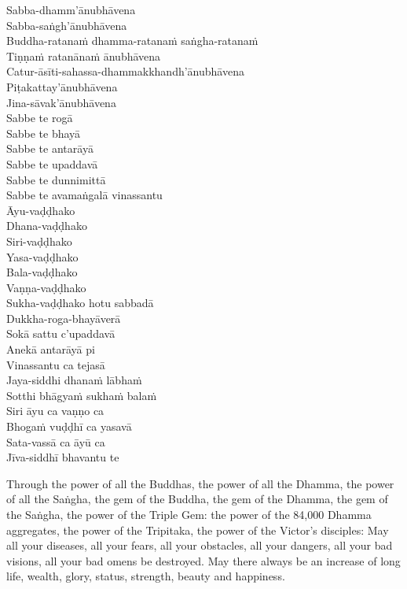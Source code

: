 \vspace{-0.99em}

\begin{pali-hang}
  Sabba-dhamm'ānubhāvena\\
  Sabba-saṅgh'ānubhāvena\\
  Buddha-ratanaṁ dhamma-ratanaṁ saṅgha-ratanaṁ\\
  Tiṇṇaṁ ratanānaṁ ānubhāvena\\
  Catur-āsīti-sahassa-dhammakkhandh'ānubhāvena\\
  Piṭakattay'ānubhāvena\\
  Jina-sāvak'ānubhāvena\\
  Sabbe te rogā\\
  Sabbe te bhayā\\
  Sabbe te antarāyā\\
  Sabbe te upaddavā\\
  Sabbe te dunnimittā\\
  Sabbe te avamaṅgalā vinassantu\\
  Āyu-vaḍḍhako\\
  Dhana-vaḍḍhako\\
  Siri-vaḍḍhako\\
  Yasa-vaḍḍhako\\
  Bala-vaḍḍhako\\
  Vaṇṇa-vaḍḍhako\\
  Sukha-vaḍḍhako hotu sabbadā\\
  Dukkha-roga-bhayāverā\\
  Sokā sattu c'upaddavā\\
  Anekā antarāyā pi\\
  Vinassantu ca tejasā\\
  Jaya-siddhi dhanaṁ lābhaṁ\\
  Sotthi bhāgyaṁ sukhaṁ balaṁ\\
  Siri āyu ca vaṇṇo ca\\
  Bhogaṁ vuḍḍhī ca yasavā\\
  Sata-vassā ca āyū ca\\
  Jīva-siddhī bhavantu te
\end{pali-hang}

\begin{english-verses}
  Through the power of all the Buddhas, the power of all the Dhamma, the power of all the Saṅgha, the gem of the Buddha, the gem of the Dhamma, the gem of the Saṅgha, the power of the Triple Gem: the power of the 84,000 Dhamma aggregates, the power of the Tripitaka, the power of the Victor's disciples: May all your diseases, all your fears, all your obstacles, all your dangers, all your bad visions, all your bad omens be destroyed. May there always be an increase of long life, wealth, glory, status, strength, beauty and happiness.
\end{english-verses}

